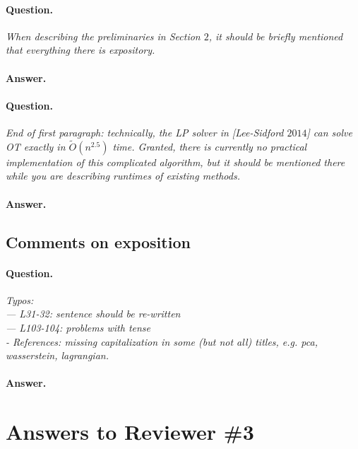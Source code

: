 \documentclass[11pt]{article}
\begin{document}
\paragraph{Question.}

\emph{When describing the preliminaries in Section $2$, it should be briefly mentioned that everything there is expository.}

\paragraph{Answer.} 

\paragraph{Question.}

\emph{End of first paragraph: technically, the LP solver in [Lee-Sidford $2014$] can solve OT exactly in $\tilde{O}(n^{2.5})$ time. Granted, there is currently no practical implementation of this complicated algorithm, but it should be mentioned there while you are describing runtimes of existing methods.}

\paragraph{Answer.} 

\subsection{Comments on exposition}

\paragraph{Question.}

\emph{Typos:\\
— L31-32: sentence should be re-written\\
— L103-104: problems with tense\\
- References: missing capitalization in some (but not all) titles, e.g. pca, wasserstein, lagrangian.}

\paragraph{Answer.} 

\section{Answers to Reviewer \#3}
\end{document}
